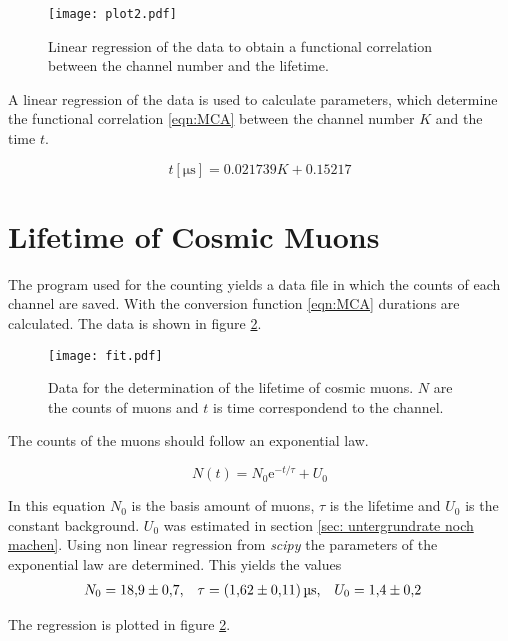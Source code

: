 \begin{figure}
    \centering
    \texttt{[image: plot2.pdf]}
    \caption{Linear regression \cite{scipy} of the data to obtain a functional correlation between the channel number and the lifetime.}
    \label{fig:MCA}
\end{figure}

A linear regression of the data is used to calculate parameters, which determine the functional correlation \ref{eqn:MCA} between the channel number $K$ and the time $t$.

\begin{equation}
    \label{eqn:MCA}
    t[\unit{\micro\second}] = 0.021739K +  0.15217
\end{equation}

\section{Lifetime of Cosmic Muons}
\label{sec:lifetime}

The program used for the counting yields a data file in which the counts of each channel are saved. With the conversion function \ref{eqn:MCA} durations are calculated. The data 
is shown in figure \ref{fig:lifetime}.

\begin{figure}
    \centering
    \texttt{[image: fit.pdf]}
    \caption{Data for the determination of the lifetime of cosmic muons. $N$ are the counts of muons and $t$ is time correspondend to the channel.}
    \label{fig:lifetime}
\end{figure}

The counts of the muons should follow an exponential law. 

\begin{equation}
    \label{eqn:exp}
    N(t) = N_0 \mathrm{e}^{-t/\tau} + U_0
\end{equation}

In this equation $N_0$ is the basis amount of muons, $\tau$ is the lifetime and $U_0$ is the constant background. $U_0$ was estimated in section \ref{sec: untergrundrate noch machen}.
Using non linear regression from \textit{scipy} \cite{scipy} the parameters of the exponential law are determined. This yields the values
\begin{align*}
    N_0 &= \num{18.9 +- 0.7}, & \tau &= \qty{1.62 +- 0.11}{\micro\second}, & U_0 &= \num{1.4 +- 0.2}
\end{align*}

The regression is plotted in figure \ref{fig:lifetime}.